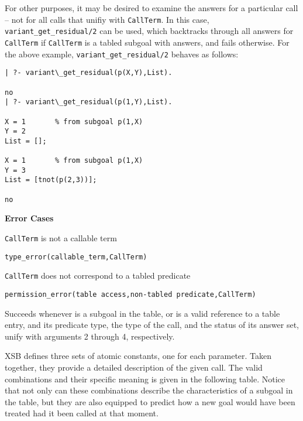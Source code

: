 \begin{description}
For other purposes, it may be desired to examine the answers for a
particular call -- not for all calls that unifiy with {\tt CallTerm}.
In this case, {\tt variant\_get\_residual/2} can be used, which
backtracks through all answers for {\tt CallTerm} if {\tt CallTerm} is
a tabled subgoal with answers, and fails otherwise.  For the above
example, {\tt variant\_get\_residual/2} behaves as follows:

\begin{center}
\begin{small}
\begin{verbatim} 
| ?- variant\_get_residual(p(X,Y),List).

no
| ?- variant\_get_residual(p(1,Y),List).

X = 1       % from subgoal p(1,X)
Y = 2
List = [];

X = 1       % from subgoal p(1,X)
Y = 3
List = [tnot(p(2,3))];

no
\end{verbatim}
\end{small}
\end{center}

{\bf Error Cases}
\bi
\item {\tt CallTerm} is not a callable term
\bi
\item {\tt type\_error(callable\_term,CallTerm)}
\ei
\item {\tt CallTerm} does not correspond to a tabled predicate
\bi
\item 	{\tt permission\_error(table access,non-tabled predicate,{\tt CallTerm})}
\ei
\ei



%
Succeeds whenever  is a subgoal in the table, or
 is a valid reference to a table entry, and its
predicate type, the type of the call, and the status of its answer
set, unify with arguments 2 through 4, respectively.

XSB defines three sets of atomic constants, one for each parameter.
Taken together, they provide a detailed description of the given call.
The valid combinations and their specific meaning is given in the
following table.  Notice that not only can these combinations describe
the characteristics of a subgoal in the table, but they are also
equipped to predict how a new goal would have been treated had it been
called at that moment.


\end{description}
